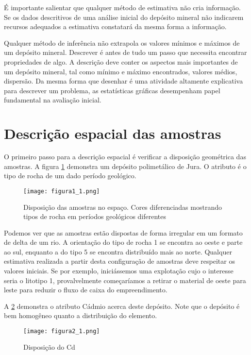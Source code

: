 É importante salientar que qualquer método de estimativa não cria informação. Se os dados descritivos de uma análise inicial do depósito mineral não indicarem recursos adequados a estimativa constatará da mesma forma a informação. 

Qualquer método de inferência não extrapola os valores mínimos e máximos de um depósito mineral. Descrever é antes de tudo um passo que necessita encontrar propriedades de algo. A descrição deve conter os aspectos mais importantes de um depósito mineral, tal como mínimo e máximo encontrados, valores médios, dispersão. Da mesma forma que desenhar é uma atividade altamente explicativa para descrever um problema, as estatísticas gráficas desempenham papel fundamental na avaliação inicial.

\section{ Descrição espacial das amostras}

O primeiro passo para a descrição espacial é verificar a disposição geométrica das amostras. A figura \ref{Fig1_1} demonstra um depósito polimetálico de Jura. O atributo é o tipo de rocha de um dado período geológico.  

\begin{figure}[H]
\centering
\texttt{[image: figura1\_1.png]}	
\caption{Disposição das amostras no espaço. Cores diferenciadas mostrando tipos de rocha em períodos geológicos diferentes}
\label{Fig1_1}
\end{figure}

Podemos ver que as amostras estão dispostas de forma irregular em um formato de delta de um rio. A orientação do tipo de rocha 1 se encontra ao oeste e parte ao sul, enquanto a do tipo 5 se encontra distribuído mais ao norte. Qualquer estimativa realizada a partir desta configuração de amostras deve respeitar os valores iniciais. Se por exemplo, iniciássemos uma explotação cujo o interesse seria o litotipo 1, provalvelmente começaríamos a retirar o material de oeste para leste para reduzir o fluxo de caixa do empreendimento. 

A \ref{Fig2_1} demonstra o atributo Cádmio acerca deste depósito. Note que o depósito é bem homogêneo quanto a distribuição do elemento. 

\begin{figure}[H]
\centering
\texttt{[image: figura2\_1.png]}	
\caption{Disposição do Cd}
\label{Fig2_1}
\end{figure}

